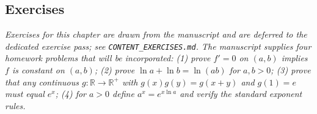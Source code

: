 \subsection*{Exercises}

\emph{Exercises for this chapter are drawn from the manuscript and are deferred to the dedicated exercise pass; see \texttt{CONTENT\_EXERCISES.md}. The manuscript supplies four homework problems that will be incorporated: (1) prove \(f' = 0\) on \((a, b)\) implies \(f\) is constant on \((a, b)\); (2) prove \(\ln a + \ln b = \ln(ab)\) for \(a, b > 0\); (3) prove that any continuous \(g : \mathbb{R} \to \mathbb{R}^{+}\) with \(g(x)g(y) = g(x + y)\) and \(g(1) = e\) must equal \(e^{x}\); (4) for \(a > 0\) define \(a^{x} = e^{x \ln a}\) and verify the standard exponent rules.}

